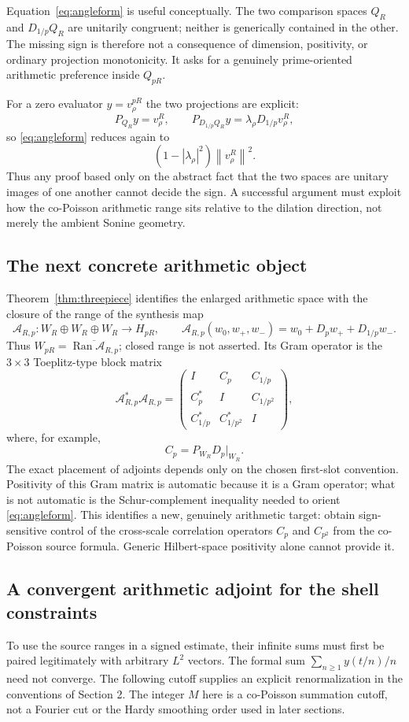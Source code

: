 \documentclass[11pt]{article}
\theoremstyle{remark}
\newcommand{\norm}[1]{\left\lVert #1\right\rVert}
\begin{document}
Equation~\eqref{eq:angleform} is useful conceptually. The two comparison spaces $Q_R$ and $D_{1/p}Q_R$ are unitarily congruent; neither is generically contained in the other. The missing sign is therefore not a consequence of dimension, positivity, or ordinary projection monotonicity. It asks for a genuinely prime-oriented arithmetic preference inside $Q_{pR}$.

For a zero evaluator $y=v_\rho^{pR}$ the two projections are explicit:
\[
 P_{Q_R}y=v_\rho^R,
 \qquad
 P_{D_{1/p}Q_R}y
 =\lambda_\rho D_{1/p}v_\rho^R,
\]
so \eqref{eq:angleform} reduces again to
\[
 (1-|\lambda_\rho|^2)\norm{v_\rho^R}^2.
\]
Thus any proof based only on the abstract fact that the two spaces are unitary images of one another cannot decide the sign. A successful argument must exploit how the co-Poisson arithmetic range sits relative to the dilation direction, not merely the ambient Sonine geometry.

\subsection*{The next concrete arithmetic object}
Theorem~\ref{thm:threepiece} identifies the enlarged arithmetic space with the closure of the range of the synthesis map
\[
 \mathcal A_{R,p}:W_R\oplus W_R\oplus W_R\longrightarrow H_{pR},
 \qquad
 \mathcal A_{R,p}(w_0,w_+,w_-)
 =w_0+D_pw_++D_{1/p}w_-.
\]
Thus $W_{pR}=\overline{\operatorname{Ran}\mathcal A_{R,p}}$; closed range is not asserted. Its Gram operator is the $3\times3$ Toeplitz-type block matrix
\[
 \mathcal A_{R,p}^*\mathcal A_{R,p}
 =\begin{pmatrix}
 I & C_p & C_{1/p}\\
 C_p^* & I & C_{1/p^2}\\
 C_{1/p}^* & C_{1/p^2}^* & I
 \end{pmatrix},
\]
where, for example,
\[
 C_p=P_{W_R}D_p\big|_{W_R}.
\]
The exact placement of adjoints depends only on the chosen first-slot convention. Positivity of this Gram matrix is automatic because it is a Gram operator; what is not automatic is the Schur-complement inequality needed to orient \eqref{eq:angleform}. This identifies a new, genuinely arithmetic target: obtain sign-sensitive control of the cross-scale correlation operators $C_p$ and $C_{p^2}$ from the co-Poisson source formula. Generic Hilbert-space positivity alone cannot provide it.


\subsection{A convergent arithmetic adjoint for the shell constraints}
To use the source ranges in a signed estimate, their infinite sums must
first be paired legitimately with arbitrary $L^2$ vectors. The formal
sum $\sum_{n\ge1}y(t/n)/n$ need not converge. The following cutoff
supplies an explicit renormalization in the conventions of Section 2.
The integer $M$ here is a co-Poisson summation cutoff, not a Fourier cut
or the Hardy smoothing order used in later sections.
\end{document}
